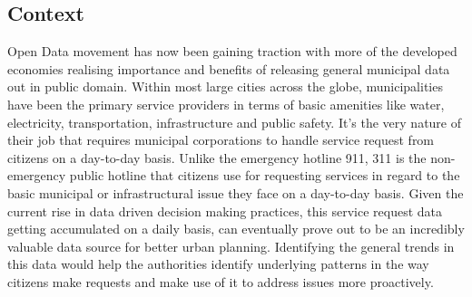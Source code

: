 \documentclass[10pt,twocolumn,letterpaper]{article}
\begin{document}
\subsection{Context}
Open Data movement has now been gaining traction with more of the developed economies realising importance and benefits of releasing general municipal data out in public domain. Within most large cities across the globe, municipalities have been the primary service providers in terms of basic amenities like water, electricity, transportation, infrastructure and public safety. It’s the very nature of their job that requires municipal corporations to handle service request from citizens on a day-to-day basis. Unlike the emergency hotline 911, 311 is the non-emergency public hotline that citizens use for requesting services in regard to the basic municipal or infrastructural issue they face on a day-to-day basis. Given the current rise in data driven decision making practices, this service request data getting accumulated on a daily basis, can eventually prove out to be an incredibly valuable data source for better urban planning. Identifying the general trends in this data would help the authorities identify underlying patterns in the way citizens make requests and make use of it to address issues more proactively.
\end{document}
